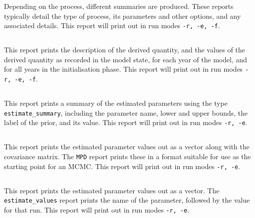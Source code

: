 Depending on the process, different summaries are produced. These reports typically detail the type of process, its parameters and other options, and any associated details. This report will print out in run modes \texttt{-r, -e, -f}.

\subsection{}\label{sec:Report-DerivedQuantity}

This report prints the description of the derived quantity, and the values of the derived quantity as recorded in the model state, for each year of the model, and for all years in the initialisation phase. This report will print out in run modes \texttt{-r, -e, -f}.

\subsection{}\label{sec:Report-EstimateSummary}

This report prints a summary of the estimated parameters using the type \texttt{estimate\_summary}, including the parameter name, lower and upper bounds, the label of the prior, and its value. This report will print out in run modes \texttt{-r, -e}.

\subsection{}\label{sec:Report-MPD}

This report prints the estimated parameter values out as a vector along with the covariance matrix. The \texttt{MPD} report prints these in a format suitable for use as the starting point for an MCMC. This report will print out in run modes \texttt{-r, -e}.

\subsection{}\label{sec:Report-EstimateValue}

This report prints the estimated parameter values out as a vector. The \texttt{estimate\_values} report prints the name of the parameter, followed by the value for that run. This report will print out in run modes \texttt{-r, -e}.

